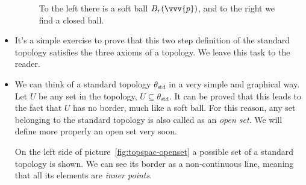 \begin{itemize}
\begin{figure}[ht]
    \caption{To the left there is a soft ball $B_r(\vvv{p})$, and to the right we find a closed ball.}
    \label{fig:topspac-softball-closedball}
  \end{figure}

\item It's a simple exercise to prove that this two step definition of the standard topology satisfies
 the three axioms of a topology. We leave this task to the reader.
  
\item We can think of a standard topology $\theta_{\text{std}}$ in a very simple and graphical way.
  Let $U$ be any set in the topology, $U\subseteq\theta_{\text{std}}$. It can be proved that this
  leads to the fact that $U$ has no border, much like a soft ball. For this reason, any set belonging
  to the standard topology is also called as an \emph{open set}.
  We will define more properly an open set very soon.

  On the left side of picture~\ref{fig:topspac-openset} a possible set of a standard topology is
  shown. We can see its border as a non-continuous line, meaning that all its elements are
  \emph{inner points}.
  

\end{itemize}
